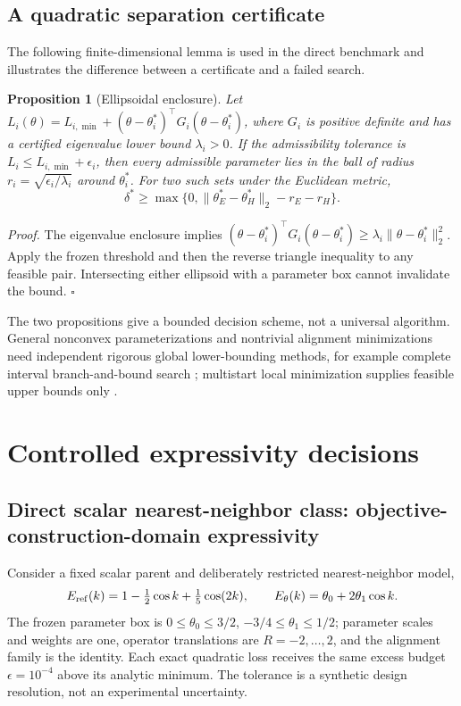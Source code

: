 \documentclass[11pt]{article}
\newtheorem{proposition}{Proposition}\newtheorem{remark}{Remark}
\begin{document}
\subsection{A quadratic separation certificate}
The following finite-dimensional lemma is used in the direct benchmark and illustrates the difference between a certificate and a failed search.
\begin{proposition}[Ellipsoidal enclosure]\label{prop:ball}
Let $L_i(\theta)=L_{i,\min}+(\theta-\theta_i^*)^\top G_i(\theta-\theta_i^*)$, where $G_i$ is positive definite and has a certified eigenvalue lower bound $\lambda_i>0$. If the admissibility tolerance is $L_i\le L_{i,\min}+\epsilon_i$, then every admissible parameter lies in the ball of radius $r_i=\sqrt{\epsilon_i/\lambda_i}$ around $\theta_i^*$. For two such sets under the Euclidean metric,
\begin{equation}\label{eq:bound}
\delta^*\ge\max\{0,\|\theta_E^*-\theta_H^*\|_2-r_E-r_H\}.
\end{equation}
\end{proposition}
\noindent\textit{Proof.} The eigenvalue enclosure implies $(\theta-\theta_i^*)^\top G_i(\theta-\theta_i^*)\ge\lambda_i\|\theta-\theta_i^*\|_2^2$. Apply the frozen threshold and then the reverse triangle inequality to any feasible pair. Intersecting either ellipsoid with a parameter box cannot invalidate the bound. \hfill$\square$

The two propositions give a bounded decision scheme, not a universal algorithm. General nonconvex parameterizations and nontrivial alignment minimizations need independent rigorous global lower-bounding methods, for example complete interval branch-and-bound search \cite{neumaier2004,moore2009}; multistart local minimization supplies feasible upper bounds only \cite{nocedal2006}.

\section{Controlled expressivity decisions}
\subsection{Direct scalar nearest-neighbor class: objective-construction-domain expressivity}
Consider a fixed scalar parent and deliberately restricted nearest-neighbor model,
\begin{equation}\label{eq:scalar}
E_{\rm ref}(k)=1-\tfrac12\cos k+\tfrac15\cos(2k),\qquad
E_\theta(k)=\theta_0+2\theta_1\cos k.
\end{equation}
The frozen parameter box is $0\le\theta_0\le3/2$, $-3/4\le\theta_1\le1/2$; parameter scales and weights are one, operator translations are $R=-2,\ldots,2$, and the alignment family is the identity. Each exact quadratic loss receives the same excess budget $\epsilon=10^{-4}$ above its analytic minimum. The tolerance is a synthetic design resolution, not an experimental uncertainty.
\end{document}
